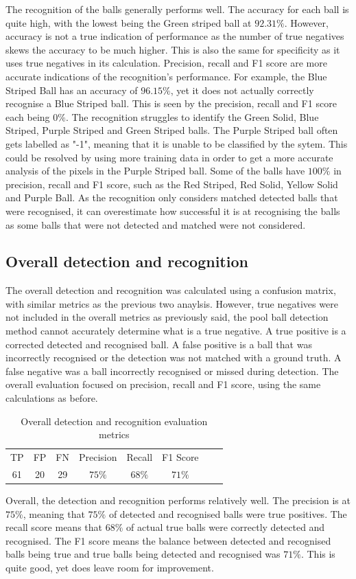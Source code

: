 \documentclass[12pt]{article}
\begin{document}
The recognition of the balls generally performs well. The accuracy for each ball is quite high, with the lowest being the Green striped ball at $92.31\%$. However, accuracy is not a true indication of performance as the number of true negatives skews the accuracy to be much higher. This is also the same for specificity as it uses true negatives in its calculation. Precision, recall and F1 score are more accurate indications of the recognition's performance. For example, the Blue Striped Ball has an accuracy of $96.15\%$, yet it does not actually correctly recognise a Blue Striped ball. This is seen by the precision, recall and F1 score each being $0\%$. The recognition struggles to identify the Green Solid, Blue Striped, Purple Striped and Green Striped balls. The Purple Striped ball often gets labelled as "-1", meaning that it is unable to be classified by the sytem. This could be resolved by using more training data in order to get a more accurate analysis of the pixels in the Purple Striped ball. Some of the balls have $100\%$ in precision, recall and F1 score, such as the Red Striped, Red Solid, Yellow Solid and Purple Ball. As the recognition only considers matched detected balls that were recognised, it can overestimate how successful it is at recognising the balls as some balls that were not detected and matched were not considered. 

\subsection{Overall detection and recognition}
The overall detection and recognition was calculated using a confusion matrix, with similar metrics as the previous two anaylsis. However, true negatives were not included in the overall metrics as previously said, the pool ball detection method cannot accurately determine what is a true negative. A true positive is a corrected detected and recognised ball. A false positive is a ball that was incorrectly recognised or the detection was not matched with a ground truth. A false negative was a ball incorrectly recognised or missed during detection. The overall evaluation focused on precision, recall and F1 score, using the same calculations as before. 
\begin{table}[H]
    \centering
    \begin{tabular}{|c|c|c|c|c|c|c|c|}
    \hline
         TP & FP & FN & Precision & Recall & F1 Score \\
        61 & 20 & 29 & $75\%$ & $68\%$ & $71\%$ \\
        \hline
    \end{tabular}
    \caption{Overall detection and recognition evaluation metrics }
    \label{tab:placeholder}
\end{table}
Overall, the detection and recognition performs relatively well. The precision is at $75\%$, meaning that $75\%$ of detected and recognised balls were true positives. The recall score means that $68\%$ of actual true balls were correctly detected and recognised. The F1 score means the balance between detected and recognised balls being true and true balls being detected and recognised was $71\%$. This is quite good, yet does leave room for improvement. 
\end{document}
